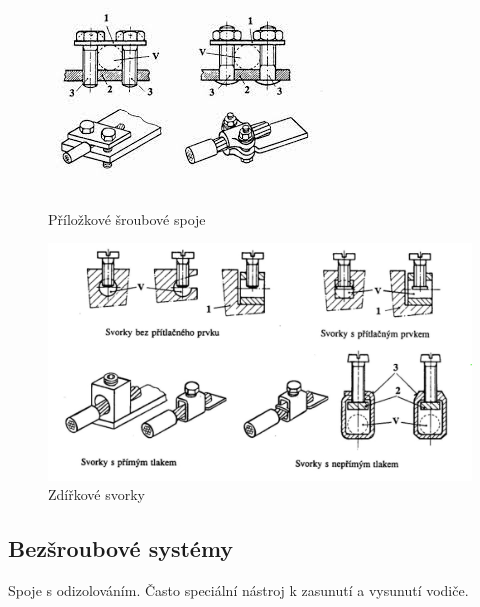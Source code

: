 \documentclass{article}
\begin{document}
\begin{figure}[H]
  \begin{minipage}[t]{0.45\textwidth}
    \centering
    \includegraphics[width=\textwidth]{sroubovatko1.jpg}
    \caption{Příložkové šroubové spoje}
  \end{minipage}
  \hfil
  \begin{minipage}[t]{0.54\textwidth}
    \centering
    \includegraphics[width=\textwidth]{sroubovatko2.png}
    \caption{Zdířkové svorky}
  \end{minipage}
\end{figure}


\subsection{Bezšroubové systémy}
Spoje s odizolováním. 
Často speciální nástroj k zasunutí a vysunutí vodiče.
\end{document}
